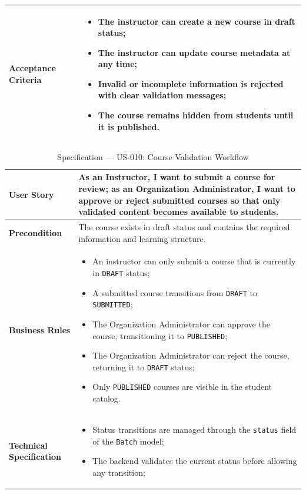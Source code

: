 \begin{table}[H]
\begin{tabularx}{\textwidth}{|p{2.5cm}|X|}
\hline
\textbf{Acceptance Criteria} &
\begin{itemize}
  \item The instructor can create a new course in draft status;
  \item The instructor can update course metadata at any time;
  \item Invalid or incomplete information is rejected with clear validation messages;
  \item The course remains hidden from students until it is published.
\end{itemize} \\
\hline
\end{tabularx}
\end{table}

\begin{table}[H]
\centering
\caption{Specification — US-010: Course Validation Workflow}
\label{tab:us010}
\renewcommand{\arraystretch}{1}
\begin{tabularx}{\textwidth}{|p{2.5cm}|X|}
\hline
\textbf{User Story} & As an Instructor, I want to submit a course for review; as an Organization Administrator, I want to approve or reject submitted courses so that only validated content becomes available to students. \\
\hline
\textbf{Precondition} & The course exists in draft status and contains the required information and learning structure. \\
\hline
\textbf{Business Rules} &
\begin{itemize}
  \item An instructor can only submit a course that is currently in \texttt{DRAFT} status;
  \item A submitted course transitions from \texttt{DRAFT} to \texttt{SUBMITTED};
  \item The Organization Administrator can approve the course, transitioning it to \texttt{PUBLISHED};
  \item The Organization Administrator can reject the course, returning it to \texttt{DRAFT} status;
  \item Only \texttt{PUBLISHED} courses are visible in the student catalog.
\end{itemize} \\
\hline
\textbf{Technical Specification} &
\begin{itemize}
  \item Status transitions are managed through the \texttt{status} field of the \texttt{Batch} model;
  \item The backend validates the current status before allowing any transition;

\end{itemize}
\end{tabularx}
\end{table}
